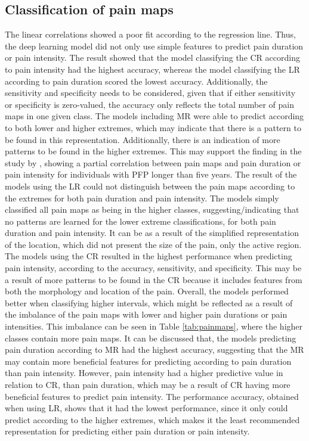\subsection{Classification of pain maps}
The linear correlations showed a poor fit according to the regression line. Thus, the deep learning model did not only use simple features to predict pain duration or pain intensity.
The result showed that the model classifying the CR according to pain intensity had the highest accuracy, whereas the model classifying the LR according to pain duration scored the lowest accuracy. Additionally, the sensitivity and specificity needs to be considered, given that if either sensitivity or specificity is zero-valued, the accuracy only reflects the total number of pain maps in one given class.\newline
\noindent
The models including MR were able to predict according to both lower and higher extremes, which may indicate that there is a pattern to be found in this representation. Additionally, there is an indication of more patterns to be found in the higher extremes. This may support  the finding in the study by \citeauthor{Boudreau2017} \citep{Boudreau2017}, showing a partial correlation between pain maps and pain duration or pain intensity for individuals with PFP longer than five years.
The result of the models using the LR could not distinguish between the pain maps according to the extremes for both pain duration and pain intensity. The models simply classified all pain maps as being in the higher classes, suggesting/indicating that no patterns are learned for the lower extreme classifications, for both pain duration and pain intensity. It can be as a result of the simplified representation of the location, which did not present the size of the pain, only the active region.
The models using the CR resulted in the highest performance when predicting pain intensity, according to the accuracy, sensitivity, and specificity. This may be a result of more patterns to be found in the CR because it includes features from both the morphology and location of the pain. 
Overall, the models performed better when classifying higher intervals, which might be reflected as a result of the imbalance of the pain maps with lower and higher pain durations or pain intensities. This imbalance can be seen in Table \ref{tab:painmaps}, where the higher classes contain more pain maps.
It can be discussed that, the models predicting pain duration according to MR had the highest accuracy, suggesting that the MR may contain more beneficial features for predicting according to pain duration than pain intensity. However, pain intensity had a higher predictive value in relation to CR, than pain duration, which may be a result of CR having more beneficial features to predict pain intensity. 
The performance accuracy, obtained when using LR, shows that it had the lowest performance, since it only could predict according to the higher extremes, which makes it the least recommended representation for predicting either pain duration or pain intensity.   

